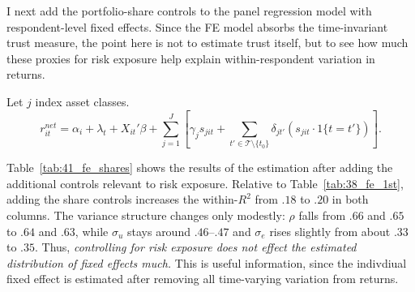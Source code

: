 \par I next add the portfolio-share controls to the panel regression model with respondent-level fixed effects. Since the FE model absorbs the time-invariant trust measure, the point here is not to estimate trust itself, but to see how much these proxies for risk exposure help explain within-respondent variation in returns.

\par Let  $j$ index asset classes.
\[
r^{net}_{it}
=
\alpha_i + \lambda_t + X_{it}'\beta
+ \sum_{j=1}^J
\left[
\gamma_j s_{jit}
+
\sum_{t' \in \mathcal{T} \setminus \{t_0\}} \delta_{jt'} \left( s_{jit} \cdot 1\{t = t'\} \right)
\right].
\]

\par Table~\ref{tab:41_fe_shares} shows the results of the estimation after adding the additional controls relevant to risk exposure. Relative to Table~\ref{tab:38_fe_1st}, adding the share controls increases the within-$R^2$ from $.18$ to $.20$ in both columns. The variance structure changes only modestly: $\rho$ falls from $.66$ and $.65$ to $.64$ and $.63$, while $\sigma_u$ stays around $.46$--$.47$ and $\sigma_e$ rises slightly from about $.33$ to $.35$. Thus, \textit{controlling for risk exposure does not effect the estimated distribution of fixed effects much.} This is useful information, since the indivdiual fixed effect is estimated after removing all time-varying variation from returns.

\begin{table}[!t]
\centering
\caption{\textbf{Panel OLS with Individual Fixed Effects and Portfolio-Share Controls}}
\label{tab:41_fe_shares}
\begin{threeparttable}
\begingroup
\setlength{\tabcolsep}{2pt}%
\renewcommand{\arraystretch}{0.70}%
\scriptsize%
\resizebox{\textwidth}{!}{%
%
}%
\endgroup
\begin{tablenotes}[flushleft]
\scriptsize
\item {}%
\end{tablenotes}
\end{threeparttable}
\end{table}

